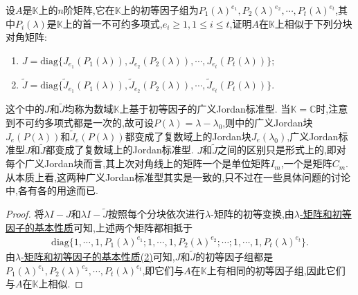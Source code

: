 \documentclass[../../main.tex]{subfiles}
\begin{document}
\begin{proposition}\label{proposition:广义标准型理论相关结论1}
设$A$是$\mathbb{K}$上的$n$阶矩阵,它在$\mathbb{K}$上的初等因子组为$P_1(\lambda)^{e_1},P_2(\lambda)^{e_2},\cdots,P_t(\lambda)^{e_t}$,其中$P_i(\lambda)$是$\mathbb{K}$上的首一不可约多项式,$e_i\geqslant 1, 1\leqslant i\leqslant t$,证明$A$在$\mathbb{K}$上相似于下列分块对角矩阵:
\begin{enumerate}[(1)]
\item $J = \mathrm{diag}\{J_{e_1}(P_1(\lambda)),J_{e_2}(P_2(\lambda)),\cdots,J_{e_t}(P_t(\lambda))\};$

\item $\widetilde{J} = \mathrm{diag}\{\widetilde{J}_{e_1}(P_1(\lambda)),\widetilde{J}_{e_2}(P_2(\lambda)),\cdots,\widetilde{J}_{e_t}(P_t(\lambda))\}.$
\end{enumerate}
\end{proposition}
\begin{remark}
这个中的$J$和$\widetilde{J}$均称为数域$\mathbb{K}$上基于初等因子的广义Jordan标准型. 当$\mathbb{K}=\mathbb{C}$时,注意到不可约多项式都是一次的,故可设$P(\lambda)=\lambda - \lambda_0$,则中的广义Jordan块$J_e(P(\lambda))$和$\widetilde{J}_e(P(\lambda))$都变成了复数域上的Jordan块$J_e(\lambda_0)$,广义Jordan标准型$J$和$\widetilde{J}$都变成了复数域上的Jordan标准型. $J$和$\widetilde{J}$之间的区别只是形式上的,即对每个广义Jordan块而言,其上次对角线上的矩阵一个是单位矩阵$I_m$,一个是矩阵$C_m$. 从本质上看,这两种广义Jordan标准型其实是一致的,只不过在一些具体问题的讨论中,各有各的用途而已. 
\end{remark}
\begin{proof}
将$\lambda I - J$和$\lambda I - \widetilde{J}$按照每个分块依次进行$\lambda$-矩阵的初等变换,由\hyperref[theorem:lambda-矩阵和初等因子的基本性质]{$\lambda$-矩阵和初等因子的基本性质}可知,上述两个矩阵都相抵于
\begin{align*}
\mathrm{diag}\{1,\cdots,1,P_1(\lambda)^{e_1};1,\cdots,1,P_2(\lambda)^{e_2};\cdots;1,\cdots,1,P_t(\lambda)^{e_t}\}.
\end{align*}
由\hyperref[theorem:lambda-矩阵和初等因子的基本性质]{$\lambda$-矩阵和初等因子的基本性质(2)}可知,$J$和$\widetilde{J}$的初等因子组都是$P_1(\lambda)^{e_1},P_2(\lambda)^{e_2},\cdots,P_t(\lambda)^{e_t}$,即它们与$A$在$\mathbb{K}$上有相同的初等因子组,因此它们与$A$在$\mathbb{K}$上相似. 
\end{proof}
\end{document}
